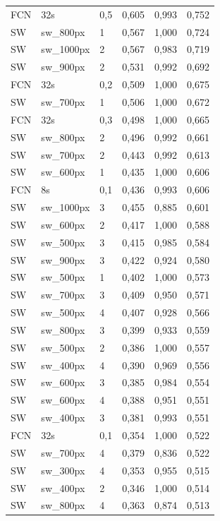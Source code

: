 \documentclass[a4paper,authoryear,review]{elsarticle}
\begin{document}
\begin{table}[]
\begin{tabular}{llllll}
		FCN & 32s        & 0,5 & 0,605 & 0,993 & 0,752 \\
		SW  & sw\_800px  & 1   & 0,567 & 1,000 & 0,724 \\
		SW  & sw\_1000px & 2   & 0,567 & 0,983 & 0,719 \\
		SW  & sw\_900px  & 2   & 0,531 & 0,992 & 0,692 \\
		FCN & 32s        & 0,2 & 0,509 & 1,000 & 0,675 \\
		SW  & sw\_700px  & 1   & 0,506 & 1,000 & 0,672 \\
		FCN & 32s        & 0,3 & 0,498 & 1,000 & 0,665 \\
		SW  & sw\_800px  & 2   & 0,496 & 0,992 & 0,661 \\
		SW  & sw\_700px  & 2   & 0,443 & 0,992 & 0,613 \\
		SW  & sw\_600px  & 1   & 0,435 & 1,000 & 0,606 \\
		FCN & 8s         & 0,1 & 0,436 & 0,993 & 0,606 \\
		SW  & sw\_1000px & 3   & 0,455 & 0,885 & 0,601 \\
		SW  & sw\_600px  & 2   & 0,417 & 1,000 & 0,588 \\
		SW  & sw\_500px  & 3   & 0,415 & 0,985 & 0,584 \\
		SW  & sw\_900px  & 3   & 0,422 & 0,924 & 0,580 \\
		SW  & sw\_500px  & 1   & 0,402 & 1,000 & 0,573 \\
		SW  & sw\_700px  & 3   & 0,409 & 0,950 & 0,571 \\
		SW  & sw\_500px  & 4   & 0,407 & 0,928 & 0,566 \\
		SW  & sw\_800px  & 3   & 0,399 & 0,933 & 0,559 \\
		SW  & sw\_500px  & 2   & 0,386 & 1,000 & 0,557 \\
		SW  & sw\_400px  & 4   & 0,390 & 0,969 & 0,556 \\
		SW  & sw\_600px  & 3   & 0,385 & 0,984 & 0,554 \\
		SW  & sw\_600px  & 4   & 0,388 & 0,951 & 0,551 \\
		SW  & sw\_400px  & 3   & 0,381 & 0,993 & 0,551 \\
		FCN & 32s        & 0,1 & 0,354 & 1,000 & 0,522 \\
		SW  & sw\_700px  & 4   & 0,379 & 0,836 & 0,522 \\
		SW  & sw\_300px  & 4   & 0,353 & 0,955 & 0,515 \\
		SW  & sw\_400px  & 2   & 0,346 & 1,000 & 0,514 \\
		SW  & sw\_800px  & 4   & 0,363 & 0,874 & 0,513 \\

\end{tabular}
\end{table}
\end{document}
